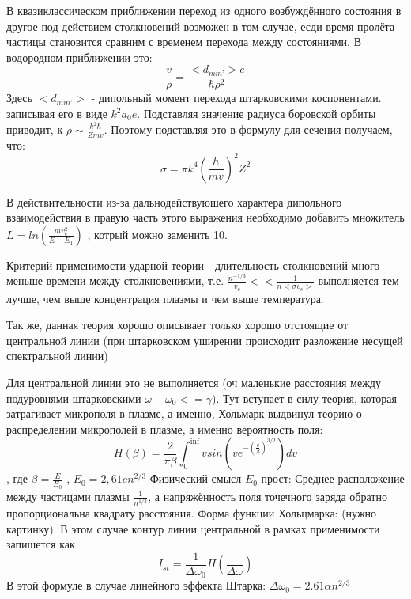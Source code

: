 \documentclass[10pt, a4paper]{article}
\numberwithin{equation}{section}
\begin{document}
В квазиклассическом приближении переход из одного возбуждённого состояния в другое под действием столкновений возможен в том случае, есди время пролёта частицы становится сравним с временем перехода между состояниями. В водородном приближении это:
\begin{equation}
	\frac{v}{\rho}=\frac{<d_{m m’}> e}{\hbar \rho^2}
\end{equation}
Здесь $<d_{m m’}>$ - дипольный момент перехода штарковскими коспонентами. записывая его в виде $k^2 a_{0} e$.
Подставляя значение радиуса боровской орбиты приводит, к $\rho \sim \frac{k^2 \hbar}{Zmv}$. Поэтому подставляя это в формулу для сечения получаем, что:
\begin{equation}
	\sigma = \pi k^4 (\frac{h}{mv})^2 Z^2
\end{equation}

В действительности из-за дальнодействуюшего характера дипольного взаимодействия в правую часть этого выражения необходимо добавить множитель $L= ln(\frac{m v_e^{2}}{E-E_1})$ , котрый можно заменить 10.

Критерий применимости ударной теории - длительность столкновений много меньше времени между столкновениями, т.е. $\frac{n^{-1/3}}{v_e} << \frac{1}{n <\sigma v_e>} $ выполняется тем лучше, чем выше концентрация плазмы и чем выше температура.

Так же, данная теория хорошо описывает только хорошо отстоящие от центральной линии (при штарковском уширении происходит разложение несущей спектральной линии)

Для центральной линии это не выполняется (оч маленькие расстояния между подуровнями штарковскими $\omega - \omega_0 <= \gamma$).
Тут вступает в силу теория, которая затрагивает микрополя в плазме, а именно, Хольмарк выдвинул теорию о распределении микрополей в плазме, а именно вероятность поля:
\begin{equation}
	H( \beta ) = \frac{2}{\pi \beta} \int_{0}^{\inf} v sin(v e^{- (\frac{v}{\beta})^{3/2}}) dv
\end{equation}
, где $\beta = \frac{E}{E_0}$ , $E_0 = 2,61 e n^{2/3}$ 
Физический смысл $E_0$ прост: Среднее расположение между частицами плазмы $\frac{1}{n^{1/3}} $, а напряжённость поля точечного заряда обратно пропорциональна квадрату расстояния. Форма функции Хольцмарка:
(нужно картинку).
В этом случае контур линии центральной в рамках применимости запишется как 
\begin{equation}
	I_{st}=\frac{1}{\Delta \omega_0} H(\frac{}{\Delta \omega})
\end{equation}
В этой формуле в случае линейного эффекта Штарка: $\Delta \omega_0 = 2.61 \alpha n^{2/3}$
\end{document}
